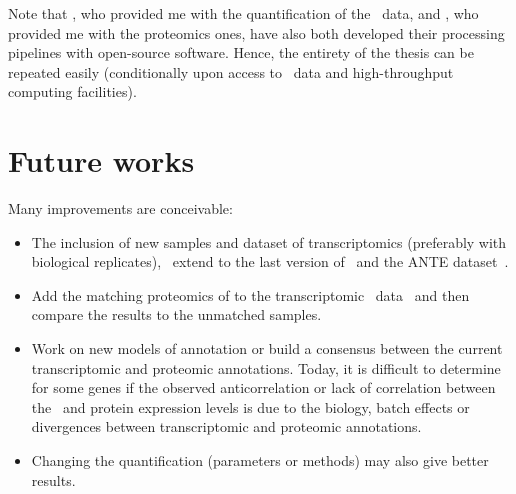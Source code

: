 Note that \nuno, who provided me with the quantification of the \gtex\ data,
and \james, who provided me with the proteomics ones,
have also both developed their processing pipelines with open-source software.
Hence, the entirety of the thesis can be repeated easily
(conditionally upon access to \gtex\ data and high-throughput computing facilities).\mybr\

\section*{Future works}
Many improvements are conceivable:\mybr\
\begin{itemize}[topsep=0pt,nosep]
        \item The inclusion of new samples and dataset of transcriptomics
            (preferably with biological replicates),
            \eg\ extend to the last version of \gtex\ and
            the ANTE dataset~.
        \item Add the matching proteomics of \citet{Wang2019-ut}
            to the transcriptomic \uhlen\ data~\mycite{Uhlen2015}
            and then compare the results to the unmatched samples.
        \item Work on new models of annotation or
            build a consensus between the current transcriptomic and proteomic
            annotations.
            Today, it is difficult to determine for some genes
            if the observed anticorrelation or lack of correlation
            between the \mRNA\ and protein expression levels is due to the biology,
            batch effects or divergences between transcriptomic and
            proteomic annotations.
        \item Changing the quantification (parameters or methods)
            may also give better results.
\end{itemize}

